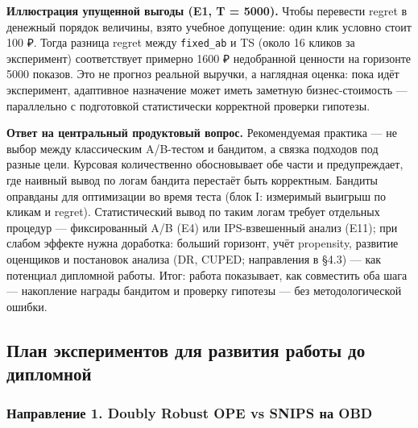 \textbf{Иллюстрация упущенной выгоды (E1, T = 5000).} Чтобы перевести regret в денежный порядок величины, взято учебное допущение: один клик условно стоит 100 ₽. Тогда разница regret между \texttt{fixed\_ab} и TS (около 16 кликов за эксперимент) соответствует примерно 1600 ₽ недобранной ценности на горизонте 5000 показов. Это не прогноз реальной выручки, а наглядная оценка: пока идёт эксперимент, адаптивное назначение может иметь заметную бизнес-стоимость --- параллельно с подготовкой статистически корректной проверки гипотезы.

\textbf{Ответ на центральный продуктовый вопрос.} Рекомендуемая практика --- не выбор между классическим A/B-тестом и бандитом, а связка подходов под разные цели. Курсовая количественно обосновывает обе части и предупреждает, где наивный вывод по логам бандита перестаёт быть корректным. Бандиты оправданы для оптимизации во время теста (блок I: измеримый выигрыш по кликам и regret). Статистический вывод по таким логам требует отдельных процедур --- фиксированный A/B (E4) или IPS-взвешенный анализ (E11); при слабом эффекте нужна доработка: больший горизонт, учёт propensity, развитие оценщиков и постановок анализа (DR, CUPED; направления в §4.3) --- как потенциал дипломной работы. Итог: работа показывает, как совместить оба шага --- накопление награды бандитом и проверку гипотезы --- без методологической ошибки.

\subsection{План экспериментов для развития работы до дипломной}\label{ux43fux43bux430ux43d-ux44dux43aux441ux43fux435ux440ux438ux43cux435ux43dux442ux43eux432-ux434ux43bux44f-ux440ux430ux437ux432ux438ux442ux438ux44f-ux440ux430ux431ux43eux442ux44b-ux434ux43e-ux434ux438ux43fux43bux43eux43cux43dux43eux439}

\subsubsection{Направление 1. Doubly Robust OPE vs SNIPS на OBD}\label{ux43dux430ux43fux440ux430ux432ux43bux435ux43dux438ux435-1.-doubly-robust-ope-vs-snips-ux43dux430-obd}

